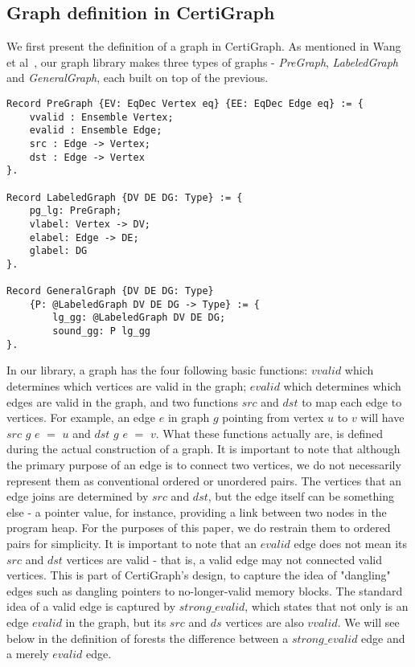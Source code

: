 \subsection{Graph definition in CertiGraph}

We first present the definition of a graph in CertiGraph. As mentioned in Wang et al~\cite{DBLP:journals/pacmpl/WangCMH19}, our graph library makes three types of graphs - \textit{PreGraph}, \textit{LabeledGraph} and \textit{GeneralGraph}, each built on top of the previous.
\begin{lstlisting}
Record PreGraph {EV: EqDec Vertex eq} {EE: EqDec Edge eq} := {
	vvalid : Ensemble Vertex;
	evalid : Ensemble Edge;
	src : Edge -> Vertex;
	dst : Edge -> Vertex
}.

Record LabeledGraph {DV DE DG: Type} := {
	pg_lg: PreGraph;
	vlabel: Vertex -> DV;
	elabel: Edge -> DE;
	glabel: DG
}.

Record GeneralGraph {DV DE DG: Type}
	{P: @LabeledGraph DV DE DG -> Type} := {
		lg_gg: @LabeledGraph DV DE DG;
		sound_gg: P lg_gg
}.
\end{lstlisting}
In our library, a graph has the four following basic functions: $vvalid$ which determines which vertices are valid in the graph; $evalid$ which determines which edges are valid in the graph, and two functions $src$ and $dst$ to map each edge to vertices. For example, an edge $e$ in graph $g$ pointing from vertex $u$ to $v$ will have $src$ $g$ $e$ $=$ $u$ and $dst$ $g$ $e$ $=$ $v$. What these functions actually are, is defined during the actual construction of a graph.
\newline\newline
It is important to note that although the primary purpose of an edge is to connect two vertices, we do not necessarily represent them as conventional ordered or unordered pairs. The vertices that an edge joins are determined by $src$ and $dst$, but the edge itself can be something else - a pointer value, for instance, providing a link between two nodes in the program heap. For the purposes of this paper, we do restrain them to ordered pairs for simplicity.
\newline\newline
It is important to note that an $evalid$ edge does not mean its $src$ and $dst$ vertices are valid - that is, a valid edge may not connected valid vertices. This is part of CertiGraph's design, to capture the idea of "dangling" edges such as dangling pointers to no-longer-valid memory blocks. The standard idea of a valid edge is captured by $strong\_evalid$, which states that not only is an edge $evalid$ in the graph, but its $src$ and $ds$ vertices are also $vvalid$. We will see below in the definition of forests the difference between a $strong\_evalid$ edge and a merely $evalid$ edge.

